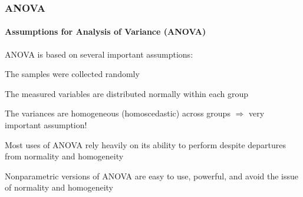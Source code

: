 \documentclass[10pt]{beamer}
\begin{document}
\begin{frame}
\frametitle{ANOVA}
\framesubtitle{Assumptions for Analysis of Variance (ANOVA)}
\bi
\item  ANOVA is based on several important assumptions:
        \bi
        \item The samples were collected randomly 
        \item The measured variables are distributed normally within each group
        \item The variances are homogeneous (homoscedastic) across groups
        $\Rightarrow$ very important assumption!
        \ei

\item Most uses of ANOVA rely heavily on its ability to perform
  despite departures from normality and homogeneity
 
\item Nonparametric versions of ANOVA are easy to use, powerful, and avoid
the issue of normality and homogeneity

\ei
\end{frame}



\end{document}
